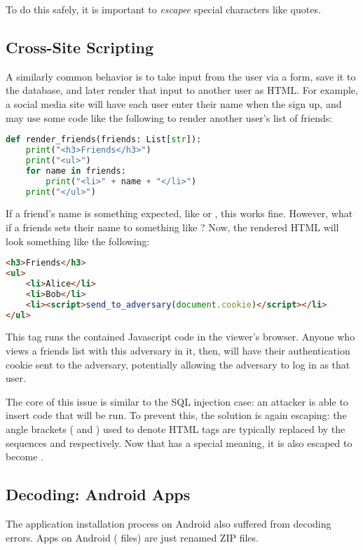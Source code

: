 
To do this safely, it is important to \emph{escapee} special characters like quotes.

\subsection{Cross-Site Scripting}
A similarly common behavior is to take input from the user via a form, save it to the database, and later render that input to another user as HTML. For example, a social media site will have each user enter their name when the sign up, and may use some code like the following to render another user's list of friends:

\begin{lstlisting}[language=python]
def render_friends(friends: List[str]):
	print("<h3>Friends</h3>")
	print("<ul>")
	for name in friends:
		print("<li>" + name + "</li>")
	print("</ul>")
\end{lstlisting}

If a friend's name is something expected, like  or , this works fine. However, what if a friends sets their name to something like ? Now, the rendered HTML will look something like the following:

\begin{lstlisting}[language=html]
<h3>Friends</h3>	
<ul>
	<li>Alice</li>
	<li>Bob</li>
	<li><script>send_to_adversary(document.cookie)</script></li>
</ul>
\end{lstlisting}

This  tag runs the contained Javascript code in the viewer's browser. Anyone who views a friends list with this adversary in it, then, will have their authentication cookie sent to the adversary, potentially allowing the adversary to log in as that user.

The core of this issue is similar to the SQL injection case: an attacker is able to insert code that will be run. To prevent this, the solution is again escaping: the angle brackets (\ttt{<} and \ttt{>}) used to denote HTML tags are typically replaced by the sequences  and  respectively. Now that \ttt{&} has a special meaning, it is also escaped to become .


\subsection{Decoding: Android Apps}
The application installation process on Android also suffered from decoding errors. Apps on Android ( files) are just renamed ZIP files.

